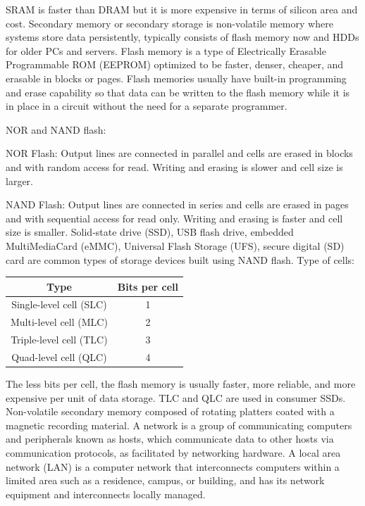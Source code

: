 \documentclass[a4paper,12pt]{report}
\begin{document}
SRAM is faster than DRAM but it is more expensive in terms of silicon area and cost.
Secondary memory or secondary storage is non-volatile memory where systems store data persistently, typically consists of flash memory now and HDDs for older PCs and servers.
Flash memory is a type of Electrically Erasable Programmable ROM (EEPROM) optimized to be faster, denser, cheaper, and erasable in blocks or pages. Flash memories usually have built-in programming and erase capability so that data can be written to the flash memory while it is in place in a circuit without the need for a separate programmer.

NOR and NAND flash:
\bit
\item NOR Flash: Output lines are connected in parallel and cells are erased in blocks and with random access for read. Writing and erasing is slower and cell size is larger.
\item NAND Flash: Output lines are connected in series and cells are erased in pages and with sequential access for read only. Writing and erasing is faster and cell size is smaller. Solid-state drive (SSD), USB flash drive, embedded MultiMediaCard (eMMC), Universal Flash Storage (UFS), secure digital (SD) card are common types of storage devices built using NAND flash.
\eit
Type of cells:
\begin{longtable}[c]{|c|c|}
\hline
Type & Bits per cell \\\hline
Single-level cell (SLC) & 1 \\\hline
Multi-level cell (MLC) & 2 \\\hline
Triple-level cell (TLC) & 3 \\\hline
Quad-level cell (QLC) & 4 \\\hline
\end{longtable}
The less bits per cell, the flash memory is usually faster, more reliable, and more expensive per unit of data storage. TLC and QLC are used in consumer SSDs.
Non-volatile secondary memory composed of rotating platters coated with a magnetic recording
material.
A network is a group of communicating computers and peripherals known as hosts, which communicate data to other hosts via communication protocols, as facilitated by networking hardware.
A local area network (LAN) is a computer network that interconnects computers within a limited area such as a residence, campus, or building, and has its network equipment and interconnects locally managed.
\end{document}
